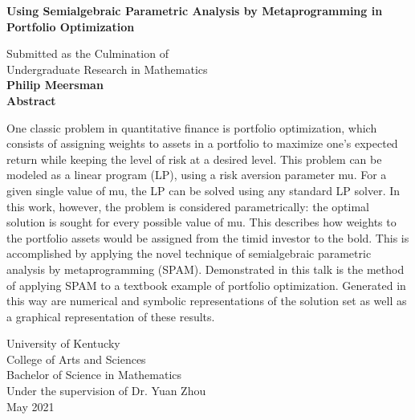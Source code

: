 \documentclass{article}
\begin{document}
\begin{titlepage}
\begin{center}
\vspace{1cm}
\large
\textbf{Using Semialgebraic Parametric Analysis by Metaprogramming in Portfolio Optimization}

\normalsize
\vspace{.5cm}
Submitted as the Culmination of \\Undergraduate Research in Mathematics\\
\vspace{.5cm}
\textbf{Philip Meersman}\\
\vspace{.5cm}
\large
\vspace{.5cm}
\normalsize
\textbf{Abstract}
\end{center}
One classic problem in quantitative finance is portfolio optimization, which consists of assigning weights to assets in a portfolio to maximize one’s expected return while keeping the level of risk at a desired level. This problem can be modeled as a linear program (LP), using a risk aversion parameter mu. For a given single value of mu, the LP can be solved using any standard LP solver. In this work, however, the problem is considered parametrically: the optimal solution is sought for every possible value of mu. This describes how weights to the portfolio assets would be assigned from the timid investor to the bold. This is accomplished by applying the novel technique of semialgebraic parametric analysis by metaprogramming (SPAM). Demonstrated in this talk is the method of applying SPAM to a textbook example of portfolio optimization. Generated in this way are numerical and symbolic representations of the solution set as well as a graphical representation of these results.

\vfill
\begin{center}	
University of Kentucky\\
College of Arts and Sciences\\
Bachelor of Science in Mathematics\\
Under the supervision of Dr. Yuan Zhou\\
May 2021\\
\end{center}
\end{titlepage}
\tableofcontents
\pagebreak
{}
\end{document}
